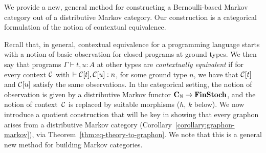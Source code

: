 We provide a new, general method for constructing a Bernoulli-based Markov
category out of a distributive Markov category.
Our construction is a categorical formulation of the notion of
contextual equivalence.

Recall that, in general, contextual equivalence for a programming language starts
with a notion of basic observation for closed programs at ground
types. We then say that programs $\Gamma\vdash t,u:A$ at other types
are \emph{contextually equivalent} if for every context $\mathcal{C}$ with $\vdash\mathcal{C}[t],\mathcal{C}[u]:n$, for some ground type $n$,
we have that $\mathcal{C}[t]$ and $\mathcal{C}[u]$ satisfy the same observations. 
In the categorical setting, the notion of observation is given by a
distributive Markov functor $\mathbf{C}_{\mathbb{N}}\to\mathbf{FinStoch}$, and the notion of
context~$\mathcal{C}$ is replaced by suitable morphisms ($h$, $k$ below). 
We now introduce a quotient construction that will be key in showing that every graphon arises from a distributive Markov category (Corollary~\ref{corollary:graphon-markov}), via Theorem~\ref{thm:eq-theory-to-graphon}.
We note that this is a general new method for building Markov categories.

